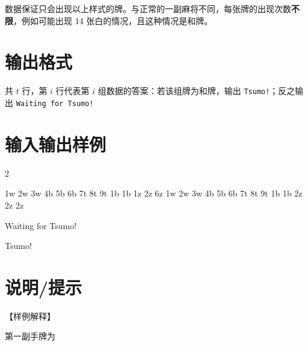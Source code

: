 \documentclass{../cpct/ctpro}
\begin{document}
数据保证只会出现以上样式的牌。与正常的一副麻将不同，每张牌的出现次数\textbf{不限}，例如可能出现 14 张白的情况，且这种情况是和牌。

\section*{输出格式}

共 $t$ 行，第 $i$ 行代表第 $i$ 组数据的答案：若该组牌为和牌，输出 \texttt{Tsumo!}；反之输出 \texttt{Waiting for Tsumo!}

\section*{输入输出样例}

\testcasetab
{
    2\par
    1w 2w 3w 4b 5b 6b 7t 8t 9t 1b 1b 1z 2z 6z
    1w 2w 3w 4b 5b 6b 7t 8t 9t 1b 1b 2z 2z 2z
}
{
    Waiting for Tsumo!\par
    Tsumo!
}

\section*{说明/提示}

【样例解释】

第一副手牌为
\end{document}
